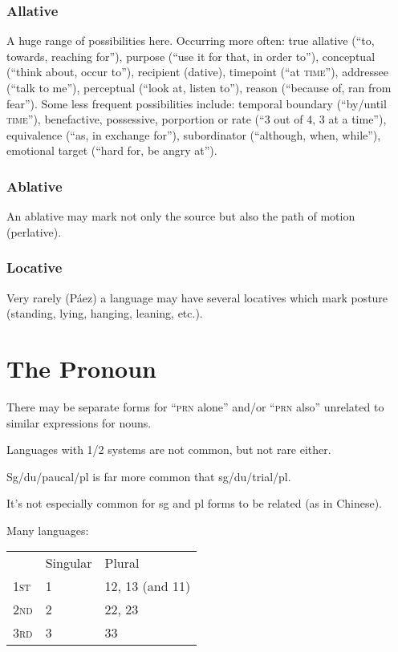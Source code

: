 \documentclass[11pt]{article}
\newcommand{\I}[1]{\textsc{#1}}   %
\begin{document}
\subsubsection{Allative} A huge range of possibilities here.
Occurring more often: true allative (``to, towards, reaching for''),
purpose (``use it for that, in order to''), conceptual (``think about,
occur to''), recipient (dative), timepoint (``at \I{time}''),
addressee (``talk to me''), perceptual (``look at, listen to''),
reason (``because of, ran from fear'').  Some less frequent
possibilities include: temporal boundary (``by/until \I{time}''),
benefactive, possessive, porportion or rate (``3 out of 4, 3 at a
time''), equivalence (``as, in exchange for''), subordinator
(``although, when, while''), emotional target (``hard for, be angry
at'').

\subsubsection{Ablative} An ablative may mark not only the source but
also the path of motion (perlative).

\subsubsection{Locative} Very rarely (Páez) a language may have
several locatives which mark posture (standing, lying, hanging,
leaning, etc.).

\section{The Pronoun}
There may be separate forms for ``\I{prn} alone'' and/or ``\I{prn}
also'' unrelated to similar expressions for nouns.

Languages with 1/2 systems are not common, but not rare either.

Sg/du/paucal/pl is far more common that sg/du/trial/pl.

It's not especially common for sg and pl forms to be related (as in
Chinese).

Many languages:

\begin{center}
\begin{tabular}{lll}
  & Singular & Plural \\
\I{1st} & 1 & 12, 13 (and 11) \\
\I{2nd} & 2 & 22, 23 \\
\I{3rd} & 3 & 33
\end{tabular}
\end{center}
\end{document}
